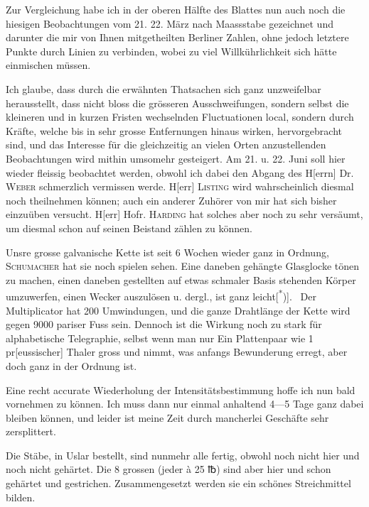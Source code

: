 Zur Vergleichung habe ich in der oberen Hälfte des Blattes nun auch
noch die hiesigen Beobachtungen vom 21. 22. März nach  Maassstabe
gezeichnet und darunter die mir von Ihnen mitgetheilten Berliner Zahlen,
ohne jedoch letztere Punkte durch Linien zu verbinden, wobei zu viel Willkührlichkeit
sich hätte einmischen müssen.

Ich glaube, dass durch die erwähnten Thatsachen sich ganz unzweifelbar
\clearpage{}
\noindent herausstellt, dass nicht bloss die grösseren Ausschweifungen, sondern selbst die
kleineren und in kurzen Fristen wechselnden Fluctuationen  local, sondern
durch Kräfte, welche bis in sehr grosse Entfernungen hinaus wirken,
hervorgebracht sind, und das Interesse für die gleichzeitig an vielen Orten
anzustellenden Beobachtungen wird mithin umsomehr gesteigert. Am 21. u.
22. Juni soll hier wieder fleissig beobachtet werden, obwohl ich dabei den
Abgang des H[errn] Dr. \textsc{Weber} schmerzlich vermissen werde. H[err] \textsc{Listing}
wird wahrscheinlich diesmal noch theilnehmen können; auch ein anderer Zuhörer
von mir hat sich bisher einzuüben versucht. H[err] Hofr. \textsc{Harding} hat
solches aber noch zu sehr versäumt, um diesmal schon auf seinen Beistand
zählen zu können.

Unsre grosse galvanische Kette ist seit 6 Wochen wieder ganz in Ordnung,
\textsc{Schumacher} hat sie noch spielen sehen. Eine daneben gehängte Glasglocke
tönen zu machen, einen daneben gestellten auf etwas schmaler Basis
stehenden Körper umzuwerfen, einen Wecker auszulösen u. dergl., ist ganz
leicht[\textsuperscript{*})].\begingroup\renewcommand{\thefootnote}{}
\endgroup\ Der Multiplicator hat 200 Umwindungen, und die ganze Drahtlänge
der Kette wird gegen 9000 pariser Fuss sein. Dennoch ist die Wirkung
noch zu stark für alphabetische Telegraphie, selbst wenn man nur Ein Plattenpaar
wie 1 pr[eussischer] Thaler gross und  nimmt,
was anfangs Bewunderung erregt, aber doch ganz in der Ordnung ist.

Eine recht accurate Wiederholung der Intensitätsbestimmung hoffe ich
nun bald vornehmen zu können. Ich muss dann nur einmal anhaltend 4—5 Tage
ganz dabei bleiben können, und leider ist meine Zeit durch mancherlei
Geschäfte sehr zersplittert.

Die Stäbe, in Uslar bestellt, sind nunmehr alle fertig, obwohl noch nicht
hier und noch nicht gehärtet. Die 8 grossen (jeder à 25 {℔}) sind aber hier
und schon gehärtet und gestrichen. Zusammengesetzt werden sie ein schönes
Streichmittel bilden.

